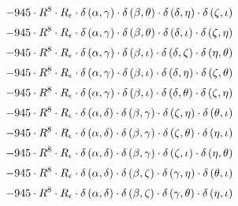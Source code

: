 \begin{subequations}
\begin{gather}
 \\[0.2em] \notag 		 - 945 \cdot R^{8} \cdot R_{\epsilon{}} \cdot \delta{}\left(\alpha{}, \gamma{}\right) \cdot \delta{}\left(\beta{}, \theta{}\right) \cdot \delta{}\left(\delta{}, \eta{}\right) \cdot \delta{}\left(\zeta{}, \iota{}\right) 
 \\[0.2em] \notag 		 - 945 \cdot R^{8} \cdot R_{\epsilon{}} \cdot \delta{}\left(\alpha{}, \gamma{}\right) \cdot \delta{}\left(\beta{}, \theta{}\right) \cdot \delta{}\left(\delta{}, \iota{}\right) \cdot \delta{}\left(\zeta{}, \eta{}\right) 
 \\[0.2em] \notag 		 - 945 \cdot R^{8} \cdot R_{\epsilon{}} \cdot \delta{}\left(\alpha{}, \gamma{}\right) \cdot \delta{}\left(\beta{}, \iota{}\right) \cdot \delta{}\left(\delta{}, \zeta{}\right) \cdot \delta{}\left(\eta{}, \theta{}\right) 
 \\[0.2em] \notag 		 - 945 \cdot R^{8} \cdot R_{\epsilon{}} \cdot \delta{}\left(\alpha{}, \gamma{}\right) \cdot \delta{}\left(\beta{}, \iota{}\right) \cdot \delta{}\left(\delta{}, \eta{}\right) \cdot \delta{}\left(\zeta{}, \theta{}\right) 
 \\[0.2em] \notag 		 - 945 \cdot R^{8} \cdot R_{\epsilon{}} \cdot \delta{}\left(\alpha{}, \gamma{}\right) \cdot \delta{}\left(\beta{}, \iota{}\right) \cdot \delta{}\left(\delta{}, \theta{}\right) \cdot \delta{}\left(\zeta{}, \eta{}\right) 
 \\[0.2em] \notag 		 - 945 \cdot R^{8} \cdot R_{\epsilon{}} \cdot \delta{}\left(\alpha{}, \delta{}\right) \cdot \delta{}\left(\beta{}, \gamma{}\right) \cdot \delta{}\left(\zeta{}, \eta{}\right) \cdot \delta{}\left(\theta{}, \iota{}\right) 
 \\[0.2em] \notag 		 - 945 \cdot R^{8} \cdot R_{\epsilon{}} \cdot \delta{}\left(\alpha{}, \delta{}\right) \cdot \delta{}\left(\beta{}, \gamma{}\right) \cdot \delta{}\left(\zeta{}, \theta{}\right) \cdot \delta{}\left(\eta{}, \iota{}\right) 
 \\[0.2em] \notag 		 - 945 \cdot R^{8} \cdot R_{\epsilon{}} \cdot \delta{}\left(\alpha{}, \delta{}\right) \cdot \delta{}\left(\beta{}, \gamma{}\right) \cdot \delta{}\left(\zeta{}, \iota{}\right) \cdot \delta{}\left(\eta{}, \theta{}\right) 
 \\[0.2em] \notag 		 - 945 \cdot R^{8} \cdot R_{\epsilon{}} \cdot \delta{}\left(\alpha{}, \delta{}\right) \cdot \delta{}\left(\beta{}, \zeta{}\right) \cdot \delta{}\left(\gamma{}, \eta{}\right) \cdot \delta{}\left(\theta{}, \iota{}\right) 
 \\[0.2em] \notag 		 - 945 \cdot R^{8} \cdot R_{\epsilon{}} \cdot \delta{}\left(\alpha{}, \delta{}\right) \cdot \delta{}\left(\beta{}, \zeta{}\right) \cdot \delta{}\left(\gamma{}, \theta{}\right) \cdot \delta{}\left(\eta{}, \iota{}\right) 

\end{gather}
\end{subequations}
